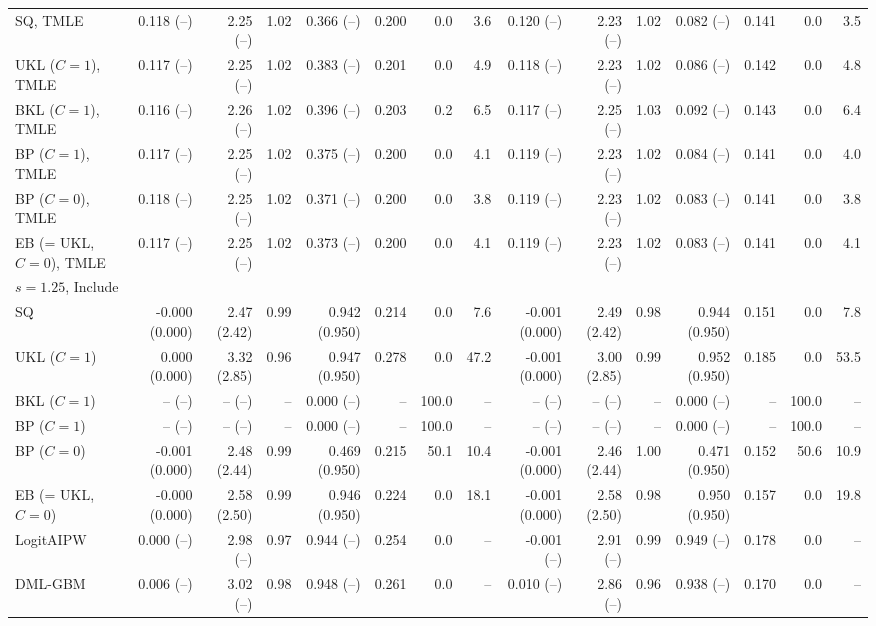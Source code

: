 \begin{tabular}{lrrrrrrrrrrrrrr}
SQ, TMLE & 0.118 (--) & 2.25 (--) & 1.02 & 0.366 (--) & 0.200 & 0.0 & 3.6 & 0.120 (--) & 2.23 (--) & 1.02 & 0.082 (--) & 0.141 & 0.0 & 3.5 \\
UKL ($C=1$), TMLE & 0.117 (--) & 2.25 (--) & 1.02 & 0.383 (--) & 0.201 & 0.0 & 4.9 & 0.118 (--) & 2.23 (--) & 1.02 & 0.086 (--) & 0.142 & 0.0 & 4.8 \\
BKL ($C=1$), TMLE & 0.116 (--) & 2.26 (--) & 1.02 & 0.396 (--) & 0.203 & 0.2 & 6.5 & 0.117 (--) & 2.25 (--) & 1.03 & 0.092 (--) & 0.143 & 0.0 & 6.4 \\
BP ($C=1$), TMLE & 0.117 (--) & 2.25 (--) & 1.02 & 0.375 (--) & 0.200 & 0.0 & 4.1 & 0.119 (--) & 2.23 (--) & 1.02 & 0.084 (--) & 0.141 & 0.0 & 4.0 \\
BP ($C=0$), TMLE & 0.118 (--) & 2.25 (--) & 1.02 & 0.371 (--) & 0.200 & 0.0 & 3.8 & 0.119 (--) & 2.23 (--) & 1.02 & 0.083 (--) & 0.141 & 0.0 & 3.8 \\
EB (= UKL, $C=0$), TMLE & 0.117 (--) & 2.25 (--) & 1.02 & 0.373 (--) & 0.200 & 0.0 & 4.1 & 0.119 (--) & 2.23 (--) & 1.02 & 0.083 (--) & 0.141 & 0.0 & 4.1 \\
\multicolumn{15}{l}{$s=1.25$, Include} \\
SQ & -0.000 (0.000) & 2.47 (2.42) & 0.99 & 0.942 (0.950) & 0.214 & 0.0 & 7.6 & -0.001 (0.000) & 2.49 (2.42) & 0.98 & 0.944 (0.950) & 0.151 & 0.0 & 7.8 \\
UKL ($C=1$) & 0.000 (0.000) & 3.32 (2.85) & 0.96 & 0.947 (0.950) & 0.278 & 0.0 & 47.2 & -0.001 (0.000) & 3.00 (2.85) & 0.99 & 0.952 (0.950) & 0.185 & 0.0 & 53.5 \\
BKL ($C=1$) & -- (--) & -- (--) & -- & 0.000 (--) & -- & 100.0 & -- & -- (--) & -- (--) & -- & 0.000 (--) & -- & 100.0 & -- \\
BP ($C=1$) & -- (--) & -- (--) & -- & 0.000 (--) & -- & 100.0 & -- & -- (--) & -- (--) & -- & 0.000 (--) & -- & 100.0 & -- \\
BP ($C=0$) & -0.001 (0.000) & 2.48 (2.44) & 0.99 & 0.469 (0.950) & 0.215 & 50.1 & 10.4 & -0.001 (0.000) & 2.46 (2.44) & 1.00 & 0.471 (0.950) & 0.152 & 50.6 & 10.9 \\
EB (= UKL, $C=0$) & -0.000 (0.000) & 2.58 (2.50) & 0.99 & 0.946 (0.950) & 0.224 & 0.0 & 18.1 & -0.001 (0.000) & 2.58 (2.50) & 0.98 & 0.950 (0.950) & 0.157 & 0.0 & 19.8 \\
LogitAIPW & 0.000 (--) & 2.98 (--) & 0.97 & 0.944 (--) & 0.254 & 0.0 & -- & -0.001 (--) & 2.91 (--) & 0.99 & 0.949 (--) & 0.178 & 0.0 & -- \\
DML-GBM & 0.006 (--) & 3.02 (--) & 0.98 & 0.948 (--) & 0.261 & 0.0 & -- & 0.010 (--) & 2.86 (--) & 0.96 & 0.938 (--) & 0.170 & 0.0 & -- \\

\end{tabular}
